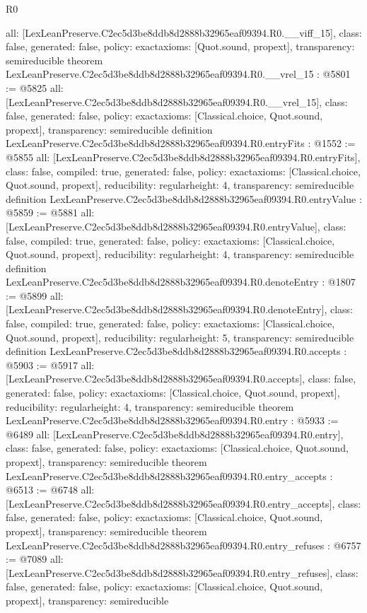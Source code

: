 \begin{lexlean}{R0}
\begin{coremodule}
{  all: [LexLeanPreserve.C2ec5d3be8ddb8d2888b32965eaf09394.R0.__viff_15],
  class: false,
  generated: false,
  policy: exact{axioms: [Quot.sound, propext]},
  transparency: semireducible
}
theorem LexLeanPreserve.C2ec5d3be8ddb8d2888b32965eaf09394.R0.__vrel_15 : @5801 := @5825 {
  all: [LexLeanPreserve.C2ec5d3be8ddb8d2888b32965eaf09394.R0.__vrel_15],
  class: false,
  generated: false,
  policy: exact{axioms: [Classical.choice, Quot.sound, propext]},
  transparency: semireducible
}
definition LexLeanPreserve.C2ec5d3be8ddb8d2888b32965eaf09394.R0.entryFits : @1552 := @5855 {
  all: [LexLeanPreserve.C2ec5d3be8ddb8d2888b32965eaf09394.R0.entryFits],
  class: false,
  compiled: true,
  generated: false,
  policy: exact{axioms: [Classical.choice, Quot.sound, propext]},
  reducibility: regular{height: 4},
  transparency: semireducible
}
definition LexLeanPreserve.C2ec5d3be8ddb8d2888b32965eaf09394.R0.entryValue : @5859 := @5881 {
  all: [LexLeanPreserve.C2ec5d3be8ddb8d2888b32965eaf09394.R0.entryValue],
  class: false,
  compiled: true,
  generated: false,
  policy: exact{axioms: [Classical.choice, Quot.sound, propext]},
  reducibility: regular{height: 4},
  transparency: semireducible
}
definition LexLeanPreserve.C2ec5d3be8ddb8d2888b32965eaf09394.R0.denoteEntry : @1807 := @5899 {
  all: [LexLeanPreserve.C2ec5d3be8ddb8d2888b32965eaf09394.R0.denoteEntry],
  class: false,
  compiled: true,
  generated: false,
  policy: exact{axioms: [Classical.choice, Quot.sound, propext]},
  reducibility: regular{height: 5},
  transparency: semireducible
}
definition LexLeanPreserve.C2ec5d3be8ddb8d2888b32965eaf09394.R0.accepts : @5903 := @5917 {
  all: [LexLeanPreserve.C2ec5d3be8ddb8d2888b32965eaf09394.R0.accepts],
  class: false,
  generated: false,
  policy: exact{axioms: [Classical.choice, Quot.sound, propext]},
  reducibility: regular{height: 4},
  transparency: semireducible
}
theorem LexLeanPreserve.C2ec5d3be8ddb8d2888b32965eaf09394.R0.entry : @5933 := @6489 {
  all: [LexLeanPreserve.C2ec5d3be8ddb8d2888b32965eaf09394.R0.entry],
  class: false,
  generated: false,
  policy: exact{axioms: [Classical.choice, Quot.sound, propext]},
  transparency: semireducible
}
theorem LexLeanPreserve.C2ec5d3be8ddb8d2888b32965eaf09394.R0.entry_accepts : @6513 := @6748 {
  all: [LexLeanPreserve.C2ec5d3be8ddb8d2888b32965eaf09394.R0.entry_accepts],
  class: false,
  generated: false,
  policy: exact{axioms: [Classical.choice, Quot.sound, propext]},
  transparency: semireducible
}
theorem LexLeanPreserve.C2ec5d3be8ddb8d2888b32965eaf09394.R0.entry_refuses : @6757 := @7089 {
  all: [LexLeanPreserve.C2ec5d3be8ddb8d2888b32965eaf09394.R0.entry_refuses],
  class: false,
  generated: false,
  policy: exact{axioms: [Classical.choice, Quot.sound, propext]},
  transparency: semireducible
}


\end{coremodule}
\end{lexlean}
